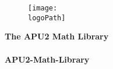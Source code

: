 \documentclass[oneside]{book}
\newcommand{\docTitleLineOne}{The APU2 Math Library}    %
\newcommand{\docTitleLineTwo}{}          %
\newcommand{\docID}{APU2-Math-Library}      %
\newcommand{\logoPath}{../../../../../script/doxygen/NXP_logo_RGB_512x960.pdf}   %
\newcommand{\+}{\discretionary{\mbox{\scriptsize$\hookleftarrow$}}{}{}}
\begin{document}
\pagestyle{empty} %

\begin{figure}
  \centering
  \texttt{[image: \\logoPath]}
\end{figure}

\vspace*{2.5cm}
\begin{flushright}
  \Huge
  \textbf{ \docTitleLineOne} \vspace*{0.4cm} \\ 
  \textbf{ \docTitleLineTwo} \\
  \huge
  \vspace*{2.0cm}
  \textbf{\docID}
\end{flushright}
\vspace*{2.4cm}
\end{document}
